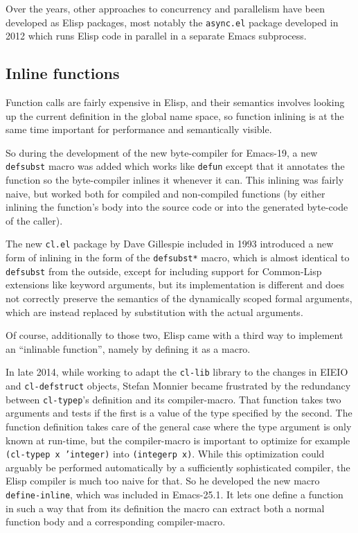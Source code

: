 \documentclass[format=acmsmall, review=false, screen=true]{acmart}
\newcommand \Elisp {Elisp}
\begin{document}
Over the years, other approaches to concurrency and parallelism have been
developed as \Elisp{} packages, most notably the \texttt{async.el} package
developed in 2012 which runs \Elisp{} code in parallel in a separate
Emacs subprocess.

\subsection{Inline functions}

Function calls are fairly expensive in \Elisp{}, and their semantics
involves looking up the current definition in the global name space, so
function inlining is at the same time important for performance and
semantically visible.

So during the development of the new byte-compiler for Emacs-19, a new
\texttt{defsubst} macro was added which works like \texttt{defun} except
that it annotates the function so the byte-compiler inlines it whenever it
can.  This inlining was fairly naive, but worked both for compiled and
non-compiled functions (by either inlining the function's body into the
source code or into the generated byte-code of the caller).

The new \texttt{cl.el} package by Dave Gillespie included in 1993 introduced
a new form of inlining in the form of the \texttt{defsubst*} macro, which is
almost identical to \texttt{defsubst} from the outside, except for including
support for Common-Lisp extensions like keyword arguments, but its
implementation is different and does not correctly preserve the semantics of
the dynamically scoped formal arguments, which are instead replaced by
substitution with the actual arguments.

Of course, additionally to those two, \Elisp{} came with a third way to
implement an ``inlinable function'', namely by defining it as a macro.

In late 2014, while working to adapt the \texttt{cl-lib} library to the
changes in EIEIO and \texttt{cl-defstruct} objects, Stefan Monnier became
frustrated by the redundancy between \texttt{cl-typep}'s definition and its
compiler-macro.  That function takes two arguments and tests if the first is
a value of the type specified by the second.  The function definition takes
care of the general case where the type argument is only known at run-time,
but the compiler-macro is important to optimize for example
\texttt{(cl-typep x 'integer)} into \texttt{(integerp x)}.  While this
optimization could arguably be performed automatically by a sufficiently
sophisticated compiler, the \Elisp{} compiler is much too naive for that.
So he developed the new macro \texttt{define-inline}, which was included in
Emacs-25.1.  It lets one define a function in such a way that from its
definition the macro can extract both a normal function body and
a corresponding compiler-macro.
\end{document}
